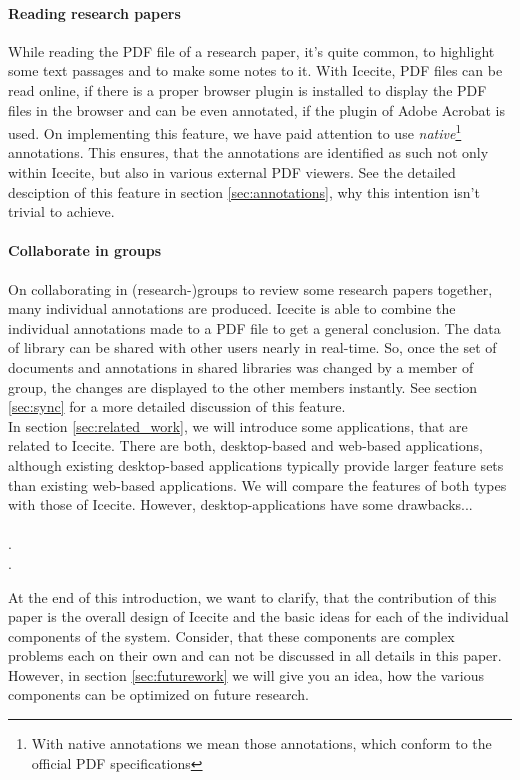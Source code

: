 \paragraph{Reading research papers} 
\noindent
While reading the PDF file of a research paper, it's quite common, to highlight some text passages and to make some notes to it. With Icecite, PDF files can be read online, if there is a proper browser plugin is installed to display the PDF files in the browser and can be even annotated, if the plugin of Adobe Acrobat is used. On implementing this feature, we have paid attention to use \textit{native}\footnote{With native annotations we mean those annotations, which conform to the official PDF specifications} annotations. This ensures, that the annotations are identified as such not only within Icecite, but also in various external PDF viewers. See the detailed desciption of this feature in section \ref{sec:annotations}, why this intention isn't trivial to achieve.

\paragraph{Collaborate in groups} 
\noindent
On collaborating in (research-)groups to review some research papers together, many individual annotations are produced. Icecite is able to combine the individual annotations made to a PDF file to get a general conclusion. The data of library can be shared with other users nearly in real-time. So, once the set of documents and annotations in shared libraries was changed by a member of group, the changes are displayed to the other members instantly. See section \ref{sec:sync} for a more detailed discussion of this feature. \\

In section \ref{sec:related_work}, we will introduce some applications, that are related to Icecite. There are both, desktop-based and web-based applications, although existing desktop-based applications typically provide larger feature sets than existing web-based applications. We will compare the features of both types with those of Icecite.
However, desktop-applications have some drawbacks... \\
\\
.\\
.

At the end of this introduction, we want to clarify, that the contribution of this paper is the overall design of Icecite and the basic ideas for each of the individual components of the system. Consider, that these components are complex problems each on their own and can not be discussed in all details in this paper. However, in section \ref{sec:futurework} we will give you an idea, how the various components can be optimized on future research.
